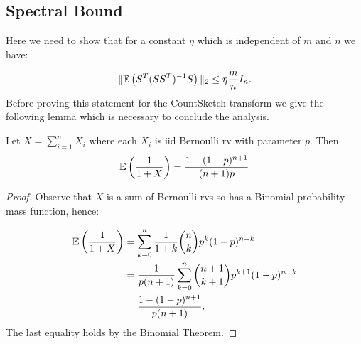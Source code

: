 \subsection{Spectral Bound}
Here we need to show that for a constant $\eta$ which is independent of $m$
and $n$ we have:

\begin{equation} \label{eq: spectral_bound}
  \| \mathbb{E} \left( S^T (S S^T)^{-1} S \right) \|_2 \le \eta \frac{m}{n} I_n.
\end{equation}
Before proving this statement for the CountSketch transform we give the following
lemma which is necessary to conclude the analysis.

\begin{Lemma} \label{lem: exp_recip_bernoulli}
  Let $X = \sum_{i=1}^n X_i$ where each $X_i$ is iid Bernoulli rv with
  parameter $p$.
  Then
  \begin{equation}
    \mathbb{E} \left( \frac{1}{1+X} \right) = \frac{1 - (1-p)^{n+1}}{(n+1)p}
  \end{equation}
\end{Lemma}

\begin{proof}
  Observe that $X$ is a sum of Bernoulli rvs so has a Binomial probability
  mass function, hence:

  \begin{align}
    \mathbb{E} \left(  \frac{1}{1+X} \right) &= \sum_{k=0}^n \frac{1}{1+k}
                {n \choose k} p^k (1-p)^{n-k} \\
                &= \frac{1}{p(n+1)} \sum_{k=0}^n {n+1 \choose k+1} p^{k+1}
                (1-p)^{n-k} \\
                &= \frac{1 - (1-p)^{n+1}}{p(n+1)}.
  \end{align}
The last equality holds by the Binomial Theorem.


%
%
\end{proof}

